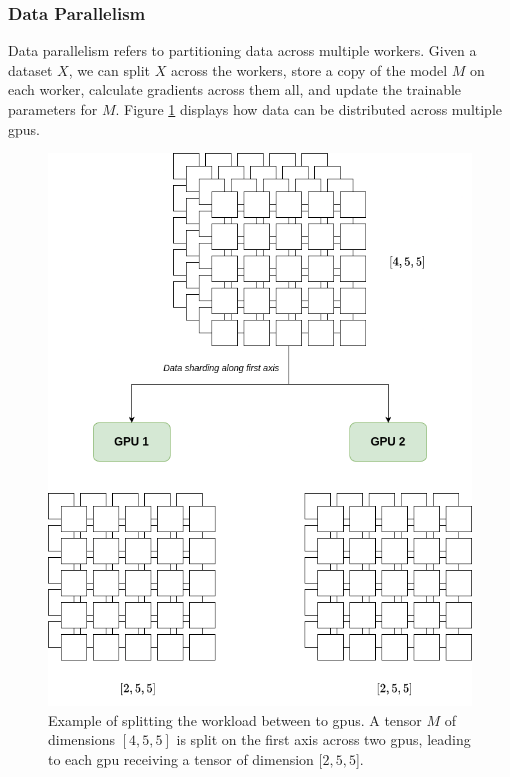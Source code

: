 \subsubsection{Data Parallelism}
Data parallelism refers to partitioning data across multiple workers. Given a dataset $X$, we can split $X$ across the workers, store a copy of the model $M$ on each worker, calculate gradients across them all, and update the trainable parameters for $M$. Figure \ref{fig:dataparallel} displays how data can be distributed across multiple \acrshort{gpu}s.
\begin{figure}[!h]
    \centering
    \includegraphics[width=0.6\linewidth]{figures/sharding.png}
    \caption{Example of splitting the workload between to \acrshort{gpu}s. A tensor $M$ of dimensions $[4,5,5]$ is split on the first axis across two \acrshort{gpu}s, leading to each \acrshort{gpu} receiving a tensor of dimension $[2,5,5$].}
    \label{fig:dataparallel}
\end{figure}

